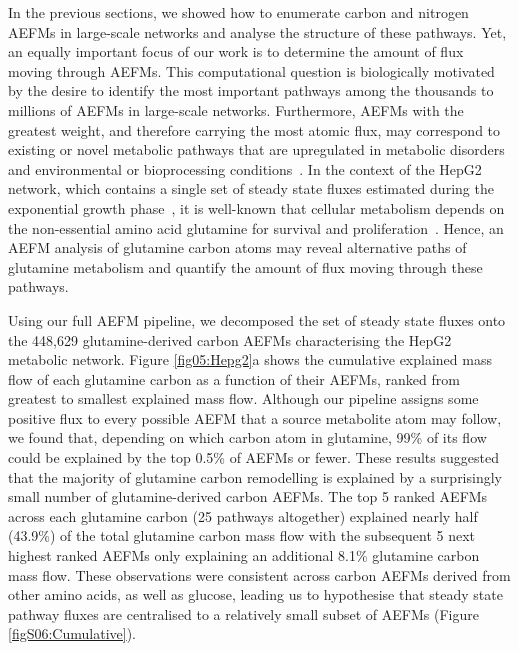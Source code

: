 \documentclass[12pt]{article}
\begin{document}
In the previous sections, we showed how to enumerate carbon and nitrogen
AEFMs in large-scale networks and analyse the structure of these pathways.
Yet, an equally important focus of our work is to determine the amount of
flux moving through AEFMs. This computational question is biologically
motivated by the desire to identify the most important pathways among the
thousands to millions of AEFMs in large-scale networks. Furthermore, AEFMs
with the greatest weight, and therefore carrying the most atomic flux, may
correspond to existing or novel metabolic pathways that are upregulated in
metabolic disorders~\citep{LanpherBrendan2006Ieom} and environmental or
bioprocessing conditions~\citep{SaccoSarahA20211mfa}. In the context of
the HepG2 network, which contains a single set of steady state fluxes
estimated during the exponential growth
phase~\citep{NilssonAvlant2020Qaoa}, it is well-known that cellular
metabolism depends on the non-essential amino acid glutamine for survival
and proliferation~\citep{YeYanyan2023Gmri,YooHeeChan2020Gric}. Hence, an
AEFM analysis of glutamine carbon atoms may reveal alternative paths of
glutamine metabolism and quantify the amount of flux moving through these
pathways.

Using our full AEFM pipeline, we decomposed the set of steady state fluxes
onto the 448,629 glutamine-derived carbon AEFMs characterising the HepG2
metabolic network. Figure \ref{fig05:Hepg2}a shows the cumulative
explained mass flow of each glutamine carbon as a function of their AEFMs,
ranked from greatest to smallest explained mass flow. Although our
pipeline assigns some positive flux to every possible AEFM that a source
metabolite atom may follow, we found that, depending on which carbon atom
in glutamine, 99\% of its flow could be explained by the top 0.5\% of
AEFMs or fewer. These results suggested that the majority of glutamine
carbon remodelling is explained by a surprisingly small number of
glutamine-derived carbon AEFMs. The top 5 ranked AEFMs across each
glutamine carbon (25 pathways altogether) explained nearly half (43.9\%)
of the total glutamine carbon mass flow with the subsequent 5 next highest
ranked AEFMs only explaining an additional 8.1\% glutamine carbon mass
flow. These observations were consistent across carbon AEFMs derived from
other amino acids, as well as glucose, leading us to hypothesise that
steady state pathway fluxes are centralised to a relatively small subset
of AEFMs (Figure \ref{figS06:Cumulative}). 
\end{document}
